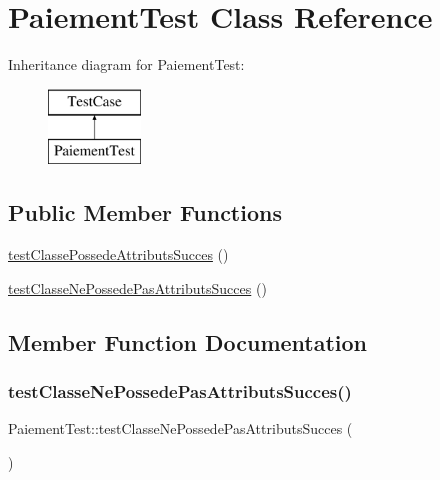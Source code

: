 \hypertarget{class_paiement_test}{}\section{Paiement\+Test Class Reference}
\label{class_paiement_test}
Inheritance diagram for Paiement\+Test\+:\begin{figure}[H]
\begin{center}
\leavevmode
\includegraphics[height=2.000000cm]{class_paiement_test}
\end{center}
\end{figure}
\subsection*{Public Member Functions}
\begin{DoxyCompactItemize}
\item 
\hyperlink{class_paiement_test_a20bde5d5b2f96a29802a96ebddc89f39}{test\+Classe\+Possede\+Attributs\+Succes} ()
\item 
\hyperlink{class_paiement_test_af499f8cb3136cd6caaba4602b4902b0a}{test\+Classe\+Ne\+Possede\+Pas\+Attributs\+Succes} ()
\end{DoxyCompactItemize}


\subsection{Member Function Documentation}
\mbox{\label{class_paiement_test_af499f8cb3136cd6caaba4602b4902b0a}} 
\subsubsection{\texorpdfstring{test\+Classe\+Ne\+Possede\+Pas\+Attributs\+Succes()}{testClasseNePossedePasAttributsSucces()}}
{\footnotesize\ttfamily Paiement\+Test\+::test\+Classe\+Ne\+Possede\+Pas\+Attributs\+Succes (\begin{DoxyParamCaption}{ }\end{DoxyParamCaption})}

